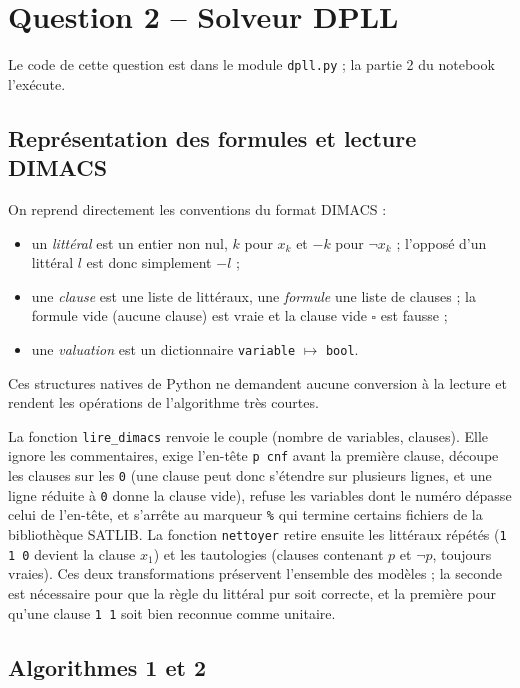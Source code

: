 \documentclass[11pt,a4paper]{article}
\begin{document}
\section{Question 2 -- Solveur DPLL}

Le code de cette question est dans le module \texttt{dpll.py} ; la partie 2 du notebook l'exécute.

\subsection{Représentation des formules et lecture DIMACS}

On reprend directement les conventions du format DIMACS :
\begin{itemize}
  \item un \emph{littéral} est un entier non nul, $k$ pour $x_k$ et $-k$ pour $\neg x_k$ ;
        l'opposé d'un littéral $l$ est donc simplement $-l$ ;
  \item une \emph{clause} est une liste de littéraux, une \emph{formule} une liste de clauses ;
        la formule vide (aucune clause) est vraie et la clause vide $\square$ est fausse ;
  \item une \emph{valuation} est un dictionnaire \texttt{variable} $\mapsto$ \texttt{bool}.
\end{itemize}
Ces structures natives de Python ne demandent aucune conversion à la lecture et rendent les
opérations de l'algorithme très courtes.

La fonction \texttt{lire\_dimacs} renvoie le couple (nombre de variables, clauses). Elle ignore
les commentaires, exige l'en-tête \texttt{p cnf} avant la première clause, découpe les clauses sur
les \texttt{0} (une clause peut donc s'étendre sur plusieurs lignes, et une ligne réduite à
\texttt{0} donne la clause vide), refuse les variables dont le numéro dépasse celui de l'en-tête,
et s'arrête au marqueur \texttt{\%} qui termine certains fichiers de la bibliothèque SATLIB.
La fonction \texttt{nettoyer} retire ensuite les littéraux répétés (\texttt{1 1 0} devient la
clause $x_1$) et les tautologies (clauses contenant $p$ et $\neg p$, toujours vraies). Ces deux
transformations préservent l'ensemble des modèles ; la seconde est nécessaire pour que la règle
du littéral pur soit correcte, et la première pour qu'une clause \texttt{1 1} soit bien reconnue
comme unitaire.

\subsection{Algorithmes 1 et 2}
\end{document}
